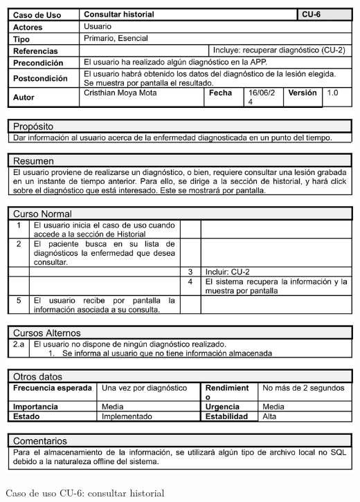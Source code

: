 \begin{table}[H]
	\centering
	\includegraphics[scale=0.85]{imagenes/cu-6.png}
	\caption{Caso de uso CU-6: consultar historial}
	\label{fig:cu6}
\end{table}

